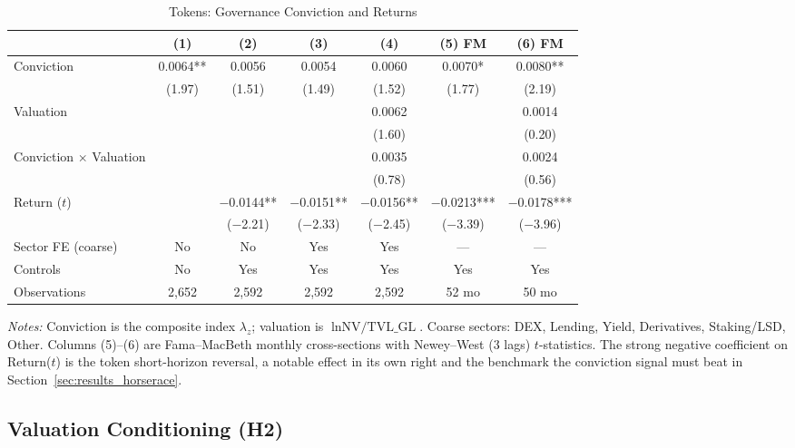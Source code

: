 \documentclass[12pt]{article}
\begin{document}
\begin{table}[ht]
\centering
\caption{Tokens: Governance Conviction and Returns}
\label{tab:token_ladder}
\small
\begin{tabular}{lcccccc}
\toprule
 & (1) & (2) & (3) & (4) & (5) FM & (6) FM \\
\midrule
Conviction & 0.0064** & 0.0056 & 0.0054 & 0.0060 & 0.0070* & 0.0080** \\
 & (1.97) & (1.51) & (1.49) & (1.52) & (1.77) & (2.19) \\
Valuation & & & & 0.0062 & & 0.0014 \\
 & & & & (1.60) & & (0.20) \\
Conviction $\times$ Valuation & & & & 0.0035 & & 0.0024 \\
 & & & & (0.78) & & (0.56) \\
Return ($t$) & & $-$0.0144** & $-$0.0151** & $-$0.0156** & $-$0.0213*** & $-$0.0178*** \\
 & & ($-$2.21) & ($-$2.33) & ($-$2.45) & ($-$3.39) & ($-$3.96) \\
\midrule
Sector FE (coarse) & No & No & Yes & Yes & --- & --- \\
Controls & No & Yes & Yes & Yes & Yes & Yes \\
Observations & 2,652 & 2,592 & 2,592 & 2,592 & 52 mo & 50 mo \\
\bottomrule
\end{tabular}
\smallskip

\parbox{0.92\linewidth}{\footnotesize
\textit{Notes:} Conviction is the composite index $\lambda_z$; valuation is
$\ln \text{NV/TVL\_GL}$. Coarse sectors: DEX, Lending, Yield, Derivatives, Staking/LSD,
Other. Columns (5)--(6) are Fama--MacBeth monthly cross-sections with Newey--West (3
lags) $t$-statistics. The strong negative coefficient on Return($t$) is the token
short-horizon reversal, a notable effect in its own right and the benchmark the
conviction signal must beat in Section~\ref{sec:results_horserace}.}
\end{table}

\subsection{Valuation Conditioning (H2)}
\label{sec:results_h2}
\end{document}
